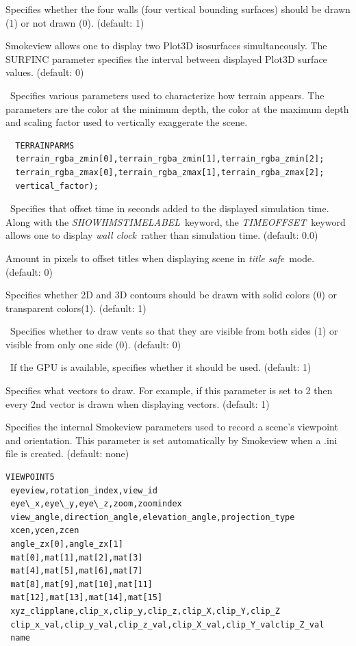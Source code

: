 \documentclass[11pt,twoside]{book}
\begin{document}
Specifies whether
the four walls (four vertical bounding surfaces) should be drawn (1) or not drawn (0).
(default: 1)

Smokeview allows one to display two Plot3D
isosurfaces simultaneously.  The SURFINC parameter specifies the
interval between displayed Plot3D surface values. (default: 0)

\ Specifies various parameters used to characterize
how terrain appears.  The parameters are the color at the minimum depth,
the color at the maximum depth and scaling factor used to vertically exaggerate
the scene.
\begin{lstlisting}
  TERRAINPARMS
  terrain_rgba_zmin[0],terrain_rgba_zmin[1],terrain_rgba_zmin[2];
  terrain_rgba_zmax[0],terrain_rgba_zmax[1],terrain_rgba_zmax[2];
  vertical_factor);
\end{lstlisting}

\ Specifies that offset time in seconds added to
the displayed simulation time.  Along with the {\em
SHOWHMSTIMELABEL}\ keyword, the {\em TIMEOFFSET}\ keyword allows
one to display {\em wall clock}\ rather than simulation time.
(default: 0.0)

Amount in pixels to offset titles when displaying
scene in {\em title safe}\ mode.   (default: 0)

Specifies whether 2D and 3D contours should be
drawn with solid colors (0) or transparent colors(1). (default: 1)

\  Specifies whether to draw vents so that they are visible from
both sides (1) or visible from only one side (0).  (default: 0)

\ If the GPU is available, specifies whether it should be used. (default: 1)

Specifies
what vectors to draw.  For example, if this parameter is set to 2 then
every 2nd vector is drawn when displaying vectors.
(default: 1)

Specifies the internal Smokeview parameters used
to record a scene's viewpoint and orientation.  This parameter is
set automatically by Smokeview when a .ini file is created.
(default: none)

{\small
\begin{lstlisting}
VIEWPOINT5
 eyeview,rotation_index,view_id
 eye\_x,eye\_y,eye\_z,zoom,zoomindex
 view_angle,direction_angle,elevation_angle,projection_type
 xcen,ycen,zcen
 angle_zx[0],angle_zx[1]
 mat[0],mat[1],mat[2],mat[3]
 mat[4],mat[5],mat[6],mat[7]
 mat[8],mat[9],mat[10],mat[11]
 mat[12],mat[13],mat[14],mat[15]
 xyz_clipplane,clip_x,clip_y,clip_z,clip_X,clip_Y,clip_Z
 clip_x_val,clip_y_val,clip_z_val,clip_X_val,clip_Y_valclip_Z_val
 name
\end{lstlisting}
}
\end{document}
